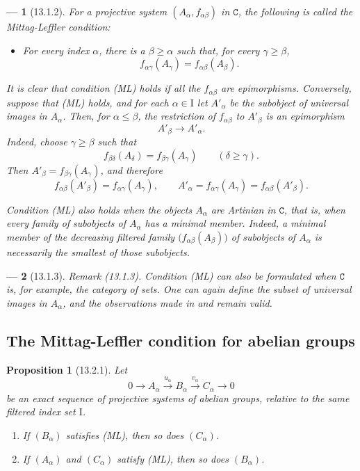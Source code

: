 \documentclass[oneside]{amsart}
\theoremstyle{ega-env-style}
\newtheorem*{env}{---}
\theoremstyle{ega-thm-env-style}
\newtheorem*{proposition}{Proposition}
\theoremstyle{ega-defn-env-style}
\def\cat{\mathtt}                   %
\def\leq{\leqslant}                 %
\def\geq{\geqslant}                 %
\let\EGAOriginalLabel\label
\renewcommand{\label}[1]{\phantomsection\EGAOriginalLabel{#1}}
\begin{document}
\begin{env}[13.1.2]
\label{0.13.1.2}
For a projective system $(A_\alpha,f_{\alpha\beta})$ in $\cat{C}$,
the following is called the \emph{Mittag-Leffler condition}:
\begin{itemize}
  \item[\textbf{(ML)}]
  \emph{For every index $\alpha$, there is a $\beta\geq\alpha$ such
  that, for every $\gamma\geq\beta$,}
  \[
    f_{\alpha\gamma}(A_\gamma)
    =
    f_{\alpha\beta}(A_\beta).
  \]
\end{itemize}

It is clear that condition (ML) holds if all the
$f_{\alpha\beta}$ are epimorphisms.
Conversely, suppose that (ML) holds, and for each
$\alpha\in\mathrm{I}$ let $A'_\alpha$ be the subobject of universal
images in $A_\alpha$.
Then, for $\alpha\leq\beta$, the restriction of
$f_{\alpha\beta}$ to $A'_\beta$ is an \emph{epimorphism}
\[
  A'_\beta\longrightarrow A'_\alpha.
\]
Indeed, choose $\gamma\geq\beta$ such that
\[
  f_{\beta\delta}(A_\delta)
  =
  f_{\beta\gamma}(A_\gamma)
  \qquad(\delta\geq\gamma).
\]
Then $A'_\beta=f_{\beta\gamma}(A_\gamma)$, and therefore
\[
  f_{\alpha\beta}(A'_\beta)
  =
  f_{\alpha\gamma}(A_\gamma),
  \qquad
  A'_\alpha
  =
  f_{\alpha\gamma}(A_\gamma)
  =
  f_{\alpha\beta}(A'_\beta).
\]

Condition (ML) also holds when the objects $A_\alpha$ are
\emph{Artinian} in $\cat{C}$, that is, when every family of
subobjects of $A_\alpha$ has a minimal member.
Indeed, a minimal member of the decreasing filtered family
$\bigl(f_{\alpha\beta}(A_\beta)\bigr)$ of subobjects of $A_\alpha$
is necessarily the smallest of those subobjects.
\end{env}

\begin{env}[13.1.3]
\label{0.13.1.3}
\emph{Remark} (13.1.3).
Condition (ML) can also be formulated when $\cat{C}$ is, for
example, the category of sets.
One can again define the subset of universal images in $A_\alpha$,
and the observations made in  and
 remain valid.
\end{env}

\subsection{The Mittag-Leffler condition for abelian groups}
\label{subsection:0.13.2}

\begin{proposition}[13.2.1]
\label{0.13.2.1}
Let
\[
  0\longrightarrow A_\alpha
  \xrightarrow{u_\alpha}B_\alpha
  \xrightarrow{v_\alpha}C_\alpha
  \longrightarrow0
\]
be an exact sequence of projective systems of abelian groups, relative
to the same filtered index set $\mathrm{I}$.
\begin{enumerate}
  \item[{\rm(i)}]
  If $(B_\alpha)$ satisfies {\rm(ML)}, then so does $(C_\alpha)$.
  \item[{\rm(ii)}]
  If $(A_\alpha)$ and $(C_\alpha)$ satisfy {\rm(ML)}, then so does
  $(B_\alpha)$.
\end{enumerate}
\end{proposition}
\end{document}
